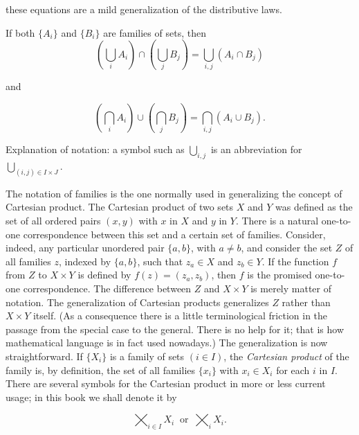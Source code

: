 these equations are a mild generalization of the distributive laws.

\begin{exercise} If both $\{ A_{i} \}$ and $\{ B_{i} \}$ are families of sets, then 
\begin{equation*}
(\bigcup_{i}A_{i}) \cap (\bigcup_{j}B_{j}) = \bigcup_{i,j}(A_{i} \cap B_{j}) 
\end{equation*}

and

\begin{equation*}
(\bigcap_{i}A_{i}) \cup (\bigcap_{j}B_{j}) = \bigcap_{i,j}(A_{i} \cup B_{j}). 
\end{equation*}
\end{exercise}

Explanation of notation: a symbol such as $\bigcup_{i,j}$ is an abbreviation for $\bigcup_{(i,j) \in I \times J}$.

The notation of families is the one normally used in generalizing the concept of Cartesian product. The Cartesian product of two sets $X$ and $Y$ was defined as the set of all ordered pairs $(x, y)$ with $x$ in $X$ and $y$ in $Y$. There is a natural one-to-one correspondence between this set and a certain set of families. Consider, indeed, any  particular unordered pair $\{ a,b \}$, with $a \neq b$, and consider the set $Z$ of all families $z$, indexed by $\{ a,b \}$, such that $ z_{a} \in X$ and $z_{b} \in Y$. If the function $f$ from $Z$ to $X \times Y$ is defined by $f(z) = (z_{a}, z_{b})$, then $f$ is the promised one-to-one correspondence. The difference between $Z$ and $X \times Y$ is merely matter of notation. The generalization of Cartesian products generalizes $Z$ rather than $X \times Y$ itself. (As a consequence there is a little terminological friction in the passage from the special case to the general. There is no help for it; that is how mathematical language is in fact used nowadays.) The generalization is now straightforward. If $\{ X_{i} \}$ is a family of sets $(i \in I)$, the \textit{Cartesian product} of the family is, by definition, the set of all families $\{ x_{i} \}$ with $x_{i} \in X_{i}$ for each $i$ in $I$. There are several symbols for the Cartesian product in more or less current usage; in this book we shall denote it by 

\begin{equation*}
\bigtimes_{i \in I}X_{i} \: \text{ or } \: \bigtimes_{i}X_{i}.
\end{equation*}

